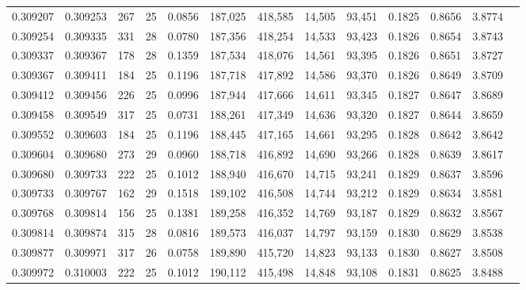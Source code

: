 \begin{tabular}{rrrrrrrrrrrrr}
0.309207 & 0.309253 &   267 &  25 &                                     0.0856 & 187,025 & 418,585 &  14,505 &  93,451 & 0.1825 & 0.8656 & 3.8774 \\
0.309254 & 0.309335 &   331 &  28 &                                     0.0780 & 187,356 & 418,254 &  14,533 &  93,423 & 0.1826 & 0.8654 & 3.8743 \\
0.309337 & 0.309367 &   178 &  28 &                                     0.1359 & 187,534 & 418,076 &  14,561 &  93,395 & 0.1826 & 0.8651 & 3.8727 \\
0.309367 & 0.309411 &   184 &  25 &                                     0.1196 & 187,718 & 417,892 &  14,586 &  93,370 & 0.1826 & 0.8649 & 3.8709 \\
0.309412 & 0.309456 &   226 &  25 &                                     0.0996 & 187,944 & 417,666 &  14,611 &  93,345 & 0.1827 & 0.8647 & 3.8689 \\
0.309458 & 0.309549 &   317 &  25 &                                     0.0731 & 188,261 & 417,349 &  14,636 &  93,320 & 0.1827 & 0.8644 & 3.8659 \\
0.309552 & 0.309603 &   184 &  25 &                                     0.1196 & 188,445 & 417,165 &  14,661 &  93,295 & 0.1828 & 0.8642 & 3.8642 \\
0.309604 & 0.309680 &   273 &  29 &                                     0.0960 & 188,718 & 416,892 &  14,690 &  93,266 & 0.1828 & 0.8639 & 3.8617 \\
0.309680 & 0.309733 &   222 &  25 &                                     0.1012 & 188,940 & 416,670 &  14,715 &  93,241 & 0.1829 & 0.8637 & 3.8596 \\
0.309733 & 0.309767 &   162 &  29 &                                     0.1518 & 189,102 & 416,508 &  14,744 &  93,212 & 0.1829 & 0.8634 & 3.8581 \\
0.309768 & 0.309814 &   156 &  25 &                                     0.1381 & 189,258 & 416,352 &  14,769 &  93,187 & 0.1829 & 0.8632 & 3.8567 \\
0.309814 & 0.309874 &   315 &  28 &                                     0.0816 & 189,573 & 416,037 &  14,797 &  93,159 & 0.1830 & 0.8629 & 3.8538 \\
0.309877 & 0.309971 &   317 &  26 &                                     0.0758 & 189,890 & 415,720 &  14,823 &  93,133 & 0.1830 & 0.8627 & 3.8508 \\
0.309972 & 0.310003 &   222 &  25 &                                     0.1012 & 190,112 & 415,498 &  14,848 &  93,108 & 0.1831 & 0.8625 & 3.8488 \\

\end{tabular}
